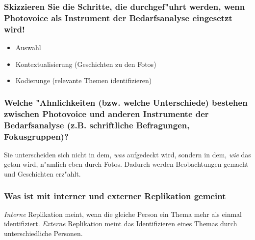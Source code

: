 \subsubsection{Skizzieren Sie die Schritte, die durchgef"uhrt werden, wenn Photovoice als Instrument der Bedarfsanalyse eingesetzt wird!}
\begin{itemize}
        \item Auswahl
        \item Kontextualisierung (Geschichten zu den Fotos)
        \item Kodierunge (relevante Themen identifizieren)
\end{itemize}

\subsubsection{Welche "Ahnlichkeiten (bzw. welche Unterschiede) bestehen zwischen Photovoice und anderen Instrumente der Bedarfsanalyse (z.B. schriftliche Befragungen, Fokusgruppen)?}
Sie unterscheiden sich nicht in dem, \emph{was} aufgedeckt wird, sondern in dem, \emph{wie} das getan wird, n"amlich eben durch Fotos. Dadurch werden Beobachtungen gemacht und Geschichten erz"ahlt. 
\subsubsection{Was ist mit interner und externer Replikation gemeint}
\emph{Interne} Replikation meint, wenn die gleiche Person ein Thema mehr als einmal identifiziert. \emph{Externe} Replikation meint das Identifizieren eines Themas durch unterschiedliche Personen.
